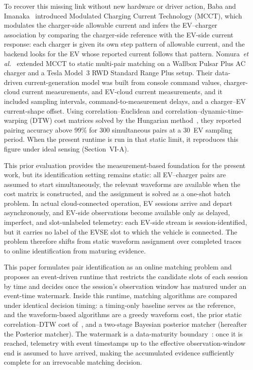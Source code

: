 \documentclass{ieeeaccess}
\newif\ifhighlight \highlightfalse
\DeclareRobustCommand{\revised}[1]{\ifhighlight{\color{blue}#1}\else{\color{.}#1}\fi}
\begin{document}
    To recover this missing link \revised{without new hardware or driver action}, Baba and Imanaka~\cite{b13} introduced Modulated Charging Current Technology (MCCT), which modulates the charger-side allowable current and infers the EV--charger association by comparing the charger-side reference with the EV-side current response\revised{: each charger is given its own step pattern of allowable current, and the backend looks for the EV whose reported current follows that pattern}.
    Nomura~\textit{et al.}~\cite{b14} extended MCCT to static multi-pair matching on a Wallbox Pulsar Plus AC charger and a Tesla Model~3 RWD Standard Range Plus setup.
    Their data-driven current-generation model was built from console command values, charger-cloud current measurements, and EV-cloud current measurements, and it included sampling intervals, command-to-measurement delays, and a charger--EV current-shape offset.
    Using correlation--Euclidean and correlation--dynamic-time-warping (DTW) cost matrices solved by the Hungarian method~\cite{b15}, they reported pairing accuracy above 99\% for 300 simultaneous pairs at a 30\, EV \revised{sampling period}.
    \revised{When the present runtime is run in that static limit, it reproduces this figure under ideal sensing (Section~VI-A).}

    This prior evaluation provides the measurement-based foundation for the present work, but its identification setting remains static: all EV--charger pairs are assumed to start simultaneously, the relevant waveforms are available when the cost matrix is constructed, and the assignment is solved as a one-shot batch problem.
    In actual cloud-connected operation, EV sessions arrive and depart asynchronously, and EV-side observations become available only as delayed, \revised{imperfect, and slot-unlabeled telemetry: each EV-side stream is session-identified, but it carries no label of the EVSE slot to which the vehicle is connected}.
    The problem therefore shifts from static waveform assignment over completed traces to online identification from maturing evidence.

    \revised{This paper formulates pair identification as an online matching problem and proposes an event-driven runtime that restricts the candidate slots of each session by time and decides once the session's observation window has matured under an event-time watermark.
    Inside this runtime, matching algorithms are compared under identical decision timing: a timing-only baseline serves as the reference, and the waveform-based algorithms are a greedy waveform cost, the prior static correlation--DTW cost of~\cite{b14}, and a two-stage Bayesian posterior matcher (hereafter the Posterior matcher).} The watermark is a data-maturity boundary~\cite{b26}: once it is reached, telemetry with event timestamps up to the effective observation-window end is assumed to have arrived, making the accumulated evidence sufficiently complete for an irrevocable matching decision.
\end{document}
